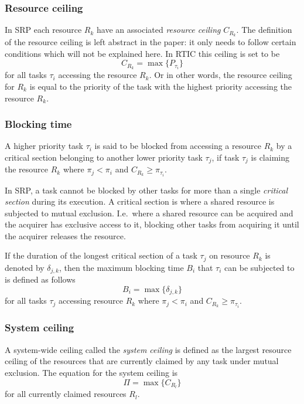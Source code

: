 \subsubsection{Resource ceiling}\label{theory:srp:definitions:resource}
In SRP each resource $R_k$ have an associated \emph{resource ceiling}
$C_{R_k}$. The definition of the resource ceiling is left abstract in the
paper\cite{srp}: it only needs to follow certain conditions which will not be
explained here. In RTIC this ceiling is set to be
\begin{equation}
    C_{R_k} = \max\{P_{\tau_i}\}
\end{equation}
for all tasks $\tau_i$ accessing the resource $R_k$. Or in other words,
the resource ceiling for $R_k$ is equal to the priority of the task with the
highest priority accessing the resource $R_k$.

\subsubsection{Blocking time}\label{theory:srp:definitions:blocking}
A higher priority task $\tau_i$ is said to be blocked from accessing a resource
$R_k$ by a critical section belonging to another lower priority task $\tau_j$,
if task $\tau_j$ is claiming the resource $R_k$ where $\pi_j < \pi_i$ and
$C_{R_k} \geq \pi_{\tau_i}$.

In SRP, a task cannot be blocked by other tasks for more than a single
\emph{critical section} during its execution. A critical section is where a
shared resource is subjected to mutual exclusion. I.e.\ where a shared resource
can be acquired and the acquirer has exclusive access to it, blocking other
tasks from acquiring it until the acquirer releases the resource.

If the duration of the longest critical section of a task $\tau_j$ on resource
$R_k$ is denoted by $\delta_{j,k}$, then the maximum blocking time $B_i$
that $\tau_i$ can be subjected to is defined as follows
\begin{equation}
    B_i = \max\{\delta_{j,k}\}
\end{equation}
for all tasks $\tau_j$ accessing resource $R_k$ where $\pi_j < \pi_i$ and
$C_{R_k} \geq \pi_{\tau_i}$.

\subsubsection{System ceiling}\label{theory:srp:definitions:system}
A system-wide ceiling called the \emph{system ceiling} is defined as the
largest resource ceiling of the resources that are currently claimed by
any task under mutual exclusion. The equation for the system ceiling is
\begin{equation}
    \Pi = \max\{C_{R_l}\}
\end{equation}
for all currently claimed resources $R_l$.

